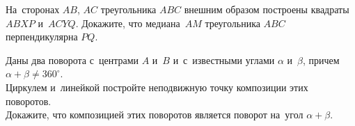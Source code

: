 \begin{problems}
\item
На~сторонах $AB$, $AC$ треугольника $ABC$ внешним образом построены квадраты
$ABXP$ и~$ACYQ$.
Докажите, что медиана~$AM$ треугольника $ABC$ перпендикулярна $PQ$.

\item
Даны два поворота с~центрами $A$ и~$B$ и~с~известными углами $\alpha$
и~$\beta$, причем $\alpha + \beta \neq 360^{\circ}$.
\\
\subproblem
Циркулем и~линейкой постройте неподвижную точку композиции этих поворотов.
\\
\subproblem
Докажите, что композицией этих поворотов является поворот
на~угол $\alpha + \beta$.

\end{problems}

